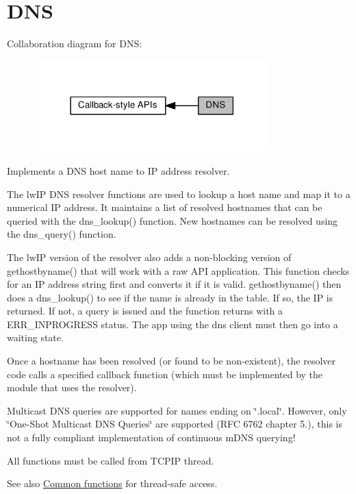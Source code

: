 \hypertarget{group__dns}{}\section{D\+NS}
\label{group__dns}
Collaboration diagram for D\+NS\+:
\nopagebreak
\begin{figure}[H]
\begin{center}
\leavevmode
\includegraphics[width=258pt]{group__dns}
\end{center}
\end{figure}
Implements a D\+NS host name to IP address resolver.

The lw\+IP D\+NS resolver functions are used to lookup a host name and map it to a numerical IP address. It maintains a list of resolved hostnames that can be queried with the dns\+\_\+lookup() function. New hostnames can be resolved using the dns\+\_\+query() function.

The lw\+IP version of the resolver also adds a non-\/blocking version of gethostbyname() that will work with a raw A\+PI application. This function checks for an IP address string first and converts it if it is valid. gethostbyname() then does a dns\+\_\+lookup() to see if the name is already in the table. If so, the IP is returned. If not, a query is issued and the function returns with a E\+R\+R\+\_\+\+I\+N\+P\+R\+O\+G\+R\+E\+SS status. The app using the dns client must then go into a waiting state.

Once a hostname has been resolved (or found to be non-\/existent), the resolver code calls a specified callback function (which must be implemented by the module that uses the resolver).

Multicast D\+NS queries are supported for names ending on \char`\"{}.\+local\char`\"{}. However, only \char`\"{}\+One-\/\+Shot Multicast D\+N\+S Queries\char`\"{} are supported (R\+FC 6762 chapter 5.), this is not a fully compliant implementation of continuous m\+D\+NS querying!

All functions must be called from T\+C\+P\+IP thread.

\begin{DoxySeeAlso}{See also}
\hyperlink{group__netconn__common}{Common functions} for thread-\/safe access. 
\end{DoxySeeAlso}
